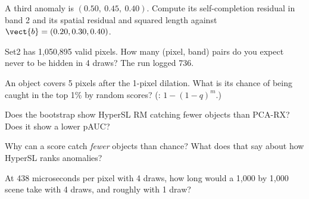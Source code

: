 \begin{checkyourself}
\item\label{ex:hsldetect:1} A third anomaly is $(0.50,\ 0.45,\ 0.40)$. Compute its self-completion residual in band 2 and its
  spatial residual and squared length against $\vect{b}=(0.20,0.30,0.40)$.
\item\label{ex:hsldetect:2} Set2 has 1,050,895 valid pixels. How many (pixel, band) pairs do you expect never to be hidden in 4
  draws? The run logged 736.
\item\label{ex:hsldetect:3} An object covers 5 pixels after the 1-pixel dilation. What is its chance of being caught in the top
  1\% by random scores? (: $1-(1-q)^m$.)
\item\label{ex:hsldetect:4} Does the bootstrap show HyperSL RM catching fewer objects than PCA-RX? Does it show a lower pAUC?
\item\label{ex:hsldetect:5} Why can a score catch \emph{fewer} objects than chance? What does that say about how HyperSL ranks
  anomalies?
\item\label{ex:hsldetect:6} At 438 microseconds per pixel with 4 draws, how long would a 1,000 by 1,000 scene take with 4 draws,
  and roughly with 1 draw?
\end{checkyourself}

